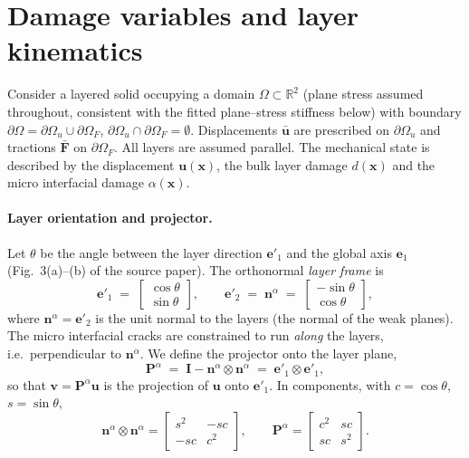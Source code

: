 \documentclass[12pt,a4paper]{article}
\newcommand{\bF}{\mathbf{F}}
\newcommand{\bI}{\mathbf{I}}
\newcommand{\bu}{\mathbf{u}}
\newcommand{\bn}{\mathbf{n}}
\newcommand{\bx}{\mathbf{x}}
\newcommand{\bP}{\mathbf{P}}
\begin{document}
	\section{Damage variables and layer kinematics}\label{sec:vars}

	Consider a layered solid occupying a domain $\Omega\subset\mathbb{R}^2$ (plane
	stress assumed throughout, consistent with the fitted plane--stress stiffness
	below) with boundary $\partial\Omega=\partial\Omega_u\cup\partial\Omega_F$,
	$\partial\Omega_u\cap\partial\Omega_F=\emptyset$. Displacements $\bar{\bu}$ are
	prescribed on $\partial\Omega_u$ and tractions $\bar{\bF}$ on
	$\partial\Omega_F$. All layers are assumed parallel. The mechanical state is
	described by the displacement $\bu(\bx)$, the bulk layer damage $d(\bx)$ and the
	micro interfacial damage $\alpha(\bx)$.

	\paragraph{Layer orientation and projector.}
	Let $\theta$ be the angle between the layer direction $\mathbf{e}'_1$ and the
	global axis $\mathbf{e}_1$ (Fig.~3(a)--(b) of the source paper). The orthonormal
	\emph{layer frame} is
	\begin{equation}\label{eq:layerframe}
		\mathbf{e}'_1 \;=\; \begin{bmatrix}\cos\theta\\[1pt]\sin\theta\end{bmatrix},
		\qquad
		\mathbf{e}'_2 \;=\; \bn^{\alpha} \;=\; \begin{bmatrix}-\sin\theta\\[1pt]\cos\theta\end{bmatrix},
	\end{equation}
	where $\bn^{\alpha}=\mathbf{e}'_2$ is the unit normal to the layers (the normal
	of the weak planes). The micro interfacial cracks are constrained to run
	\emph{along} the layers, i.e.\ perpendicular to $\bn^{\alpha}$. We define the
	projector onto the layer plane,
	\begin{equation}\label{eq:projector}
		\bP^{\alpha} \;=\; \bI - \bn^{\alpha}\!\otimes\bn^{\alpha} \;=\; \mathbf{e}'_1\!\otimes\mathbf{e}'_1,
	\end{equation}
	so that $\mathbf{v}=\bP^{\alpha}\bu$ is the projection of $\bu$ onto
	$\mathbf{e}'_1$. In components, with $c=\cos\theta$, $s=\sin\theta$,
	\begin{equation}\label{eq:Pcomp}
		\bn^{\alpha}\!\otimes\bn^{\alpha}
		=\begin{bmatrix} s^2 & -sc\\ -sc & c^2\end{bmatrix},
		\qquad
		\bP^{\alpha}
		=\begin{bmatrix} c^2 & sc\\ sc & s^2\end{bmatrix}.
	\end{equation}
\end{document}
